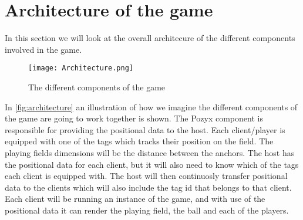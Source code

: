 \section{Architecture of the game}
In this section we will look at the overall architecure of the different components involved in the game.
\begin{figure}[H]
    \centering
    \texttt{[image: Architecture.png]}
    \caption{The different components of the game}
    \label{fig:architecture}
\end{figure}
In \autoref{fig:architecture} an illustration of how we imagine the different components of the game are going to work together is shown.
The Pozyx component is responsible for providing the positional data to the host. 
Each client/player is equipped with one of the tags which tracks their position on the field. 
The playing fields dimensions will be the distance between the anchors. 
The host has the positional data for each client, but it will also need to know which of the tags each client is equipped with.
The host will then continuosly transfer positional data to the clients which will also include the tag id that belongs to that client.
Each client will be running an instance of the game, and with use of the positional data it can render the playing field, the ball and each of the players.
